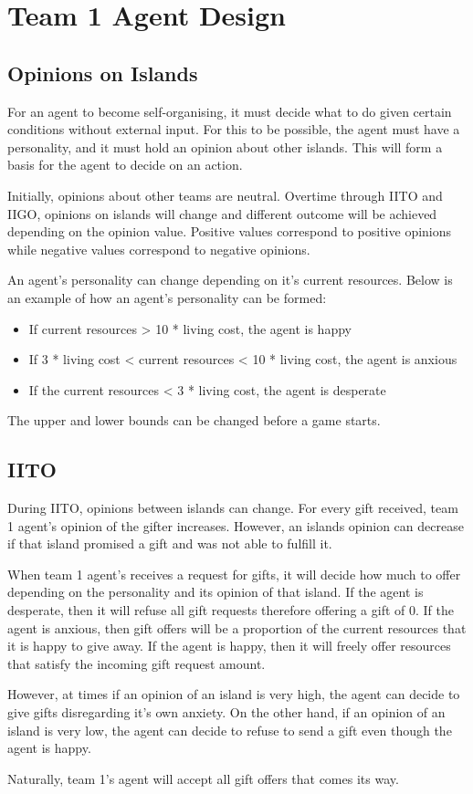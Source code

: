 \chapter{Team 1 Agent Design}

\section{Opinions on Islands}
For an agent to become self-organising, it must decide what to do given certain conditions without external input. For this to be possible, the agent must have a personality, and it must hold an opinion about other islands. This will form a basis for the agent to decide on an action.

Initially, opinions about other teams are neutral. Overtime through IITO and IIGO, opinions on islands will change and different outcome will be achieved depending on the opinion value. Positive values correspond to positive opinions while negative values correspond to negative opinions.

An agent's personality can change depending on it's current resources. Below is an example of how an agent's personality can be formed:
\begin{itemize}
    \item If current resources > 10 * living cost, the agent is happy
    \item If 3 * living cost < current resources < 10 * living cost, the agent is anxious
    \item If the current resources < 3 * living cost, the agent is desperate 
\end{itemize}
The upper and lower bounds can be changed before a game starts. 

\section{IITO}
During IITO, opinions between islands can change. For every gift received, team 1 agent's opinion of the gifter increases. However, an islands opinion can decrease if that island promised a gift and was not able to fulfill it. 

When team 1 agent's receives a request for gifts, it will decide how much to offer depending on the personality and its opinion of that island. If the agent is desperate, then it will refuse all gift requests therefore offering a gift of 0. If the agent is anxious, then gift offers will be a proportion of the current resources that it is happy to give away. If the agent is happy, then it will freely offer resources that satisfy the incoming gift request amount.

However, at times if an opinion of an island is very high, the agent can decide to give gifts disregarding it's own anxiety. On the other hand, if an opinion of an island is very low, the agent can decide to refuse to send a gift even though the agent is happy. 

Naturally, team 1's agent will accept all gift offers that comes its way. 

